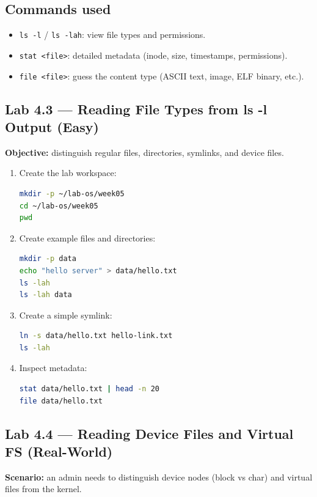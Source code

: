 \subsection*{Commands used}
\begin{itemize}
    \item \texttt{ls -l} / \texttt{ls -lah}: view file types and permissions.
    \item \texttt{stat <file>}: detailed metadata (inode, size, timestamps, permissions).
    \item \texttt{file <file>}: guess the content type (ASCII text, image, ELF binary, etc.).
\end{itemize}

\subsection*{Lab 4.3 --- Reading File Types from ls -l Output (Easy)}
\textbf{Objective:} distinguish regular files, directories, symlinks, and device files.

\begin{enumerate}
    \item Create the lab workspace:
\begin{lstlisting}[language=bash, caption={Creating the workspace for this chapter}]
mkdir -p ~/lab-os/week05
cd ~/lab-os/week05
pwd
\end{lstlisting}

    \item Create example files and directories:
\begin{lstlisting}[language=bash, caption={Creating a regular file and example directory}]
mkdir -p data
echo "hello server" > data/hello.txt
ls -lah
ls -lah data
\end{lstlisting}

    \item Create a simple symlink:
\begin{lstlisting}[language=bash, caption={Creating a symlink}]
ln -s data/hello.txt hello-link.txt
ls -lah
\end{lstlisting}

    \item Inspect metadata:
\begin{lstlisting}[language=bash, caption={Inspecting file metadata}]
stat data/hello.txt | head -n 20
file data/hello.txt
\end{lstlisting}
\end{enumerate}

\subsection*{Lab 4.4 --- Reading Device Files and Virtual FS (Real-World)}
\textbf{Scenario:} an admin needs to distinguish device nodes (block vs char)
and virtual files from the kernel.

